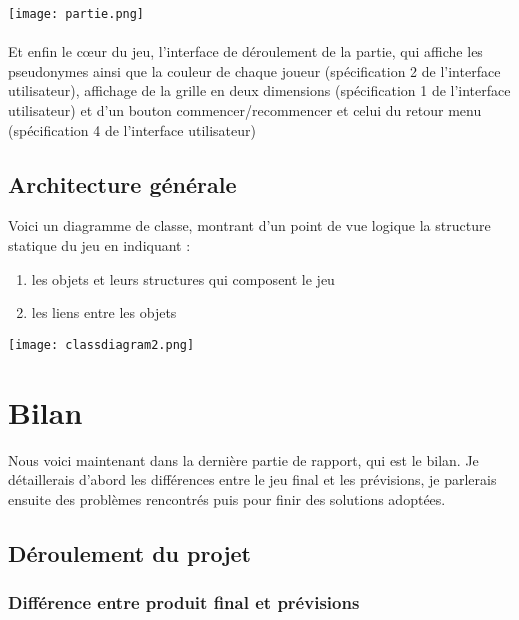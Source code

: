 \documentclass[a4paper,oneside]{article}
\begin{document}
\begin{center}
	\texttt{[image: partie.png]}
\end{center}

\paragraph{}
Et enfin le cœur du jeu, l'interface de déroulement de la partie, qui affiche les pseudonymes ainsi que la couleur de chaque joueur (spécification 2 de l'interface utilisateur), affichage de la grille en deux dimensions (spécification 1 de l'interface utilisateur) et d'un bouton commencer/recommencer et celui du retour menu (spécification 4 de l'interface utilisateur)

\subsection{Architecture générale}
Voici un diagramme de classe, montrant d'un point de vue logique la structure statique du jeu en indiquant :
\begin{enumerate}
	\item les objets et leurs structures qui composent le jeu
	\item les liens entre les objets
\end{enumerate}

\begin{center}
\texttt{[image: classdiagram2.png]}
\end{center}

\clearpage



\section{Bilan}

Nous voici maintenant dans la dernière partie de rapport, qui est le bilan.
Je détaillerais d'abord les différences entre le jeu final et les prévisions, je parlerais ensuite des problèmes rencontrés puis pour finir des solutions adoptées.

\subsection{Déroulement du projet}
\subsubsection{Différence entre produit final et prévisions}
\end{document}
